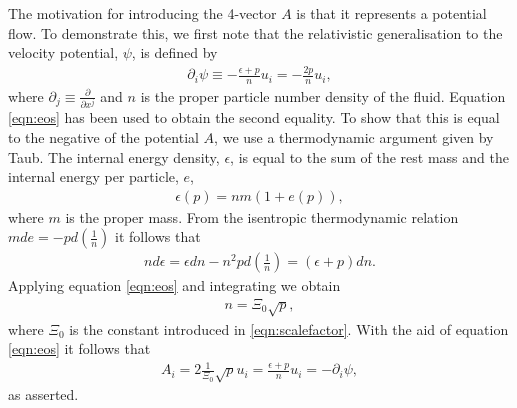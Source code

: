 \documentclass[10pt, fleqn,final,showtrims,oldfontcommands, article,a4paper,oneside]{memoir} %
\newcommand{\eqnref}[1]{\ref{eqn:#1}}
\newcommand{\scalefactor}{\Xi_0}
\newcommand{\lr}[1]{\left( #1 \right)}
\renewcommand{\d}{\partial}
\newcommand{\del}{\nabla}
\begin{document}
The motivation for introducing the 4-vector $A$ is that it represents a potential flow.
To demonstrate this, we first note that the relativistic generalisation to the velocity potential, $\psi$,  is defined\cite{LandauBook} by
\begin{align}
  \d_i \psi \equiv - \frac{\epsilon+p}{n} u_i = - \frac{2 p}{n} u_i,
\end{align}
where $\d_j \equiv \frac{\d}{\d x^j}$ and  $n$ is the proper particle number density of the fluid.
Equation \eqnref{eos} has been used to obtain the second equality.
To show that this is equal to the negative of the potential $A$, we use a thermodynamic argument given by Taub\cite{Taub1978}.
The internal energy density, $\epsilon$, is equal to the sum of the rest mass and the internal energy per particle\cite{LandauBook, Taub1978}, $e$, 
\begin{align}
  \epsilon(p) = nm( 1 + e(p)),
\end{align}
where $m$ is the proper mass.
From the isentropic thermodynamic relation $m de = - p d\lr{\frac{1}{n}}$
it follows that 
\begin{align}
 n d\epsilon = \epsilon dn - n^2 p d \lr{\frac{1}{n}} = \lr{\epsilon + p} dn.
\end{align}
Applying equation \eqnref{eos} and integrating we obtain
\begin{align}
n =\scalefactor \sqrt{   p },
\end{align}
where $\scalefactor$ is the constant introduced in \eqnref{scalefactor}.
With the aid of equation \eqnref{eos} it follows that
\begin{align}
A_i = 2\tfrac{1}{\scalefactor}\sqrt p  u_i =\frac{\epsilon + p}{n} u_i =  -\d_i \psi,
\label{eqn:AisPotFlow}
\end{align}
as asserted.
\end{document}
